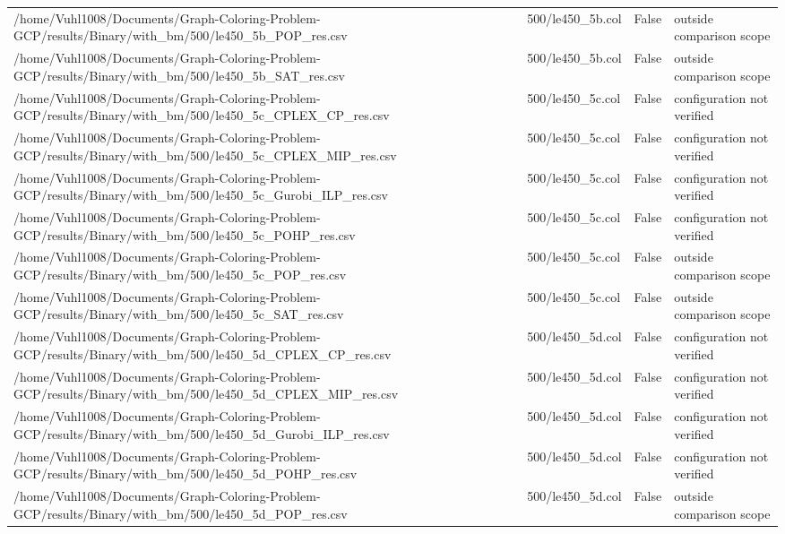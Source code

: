 \begin{table}[htbp]
\begin{tabular}{llll}
/home/Vuhl1008/Documents/Graph-Coloring-Problem-GCP/results/Binary/with\_bm/500/le450\_5b\_POP\_res.csv & 500/le450\_5b.col & False & outside comparison scope \\
/home/Vuhl1008/Documents/Graph-Coloring-Problem-GCP/results/Binary/with\_bm/500/le450\_5b\_SAT\_res.csv & 500/le450\_5b.col & False & outside comparison scope \\
/home/Vuhl1008/Documents/Graph-Coloring-Problem-GCP/results/Binary/with\_bm/500/le450\_5c\_CPLEX\_CP\_res.csv & 500/le450\_5c.col & False & configuration not verified \\
/home/Vuhl1008/Documents/Graph-Coloring-Problem-GCP/results/Binary/with\_bm/500/le450\_5c\_CPLEX\_MIP\_res.csv & 500/le450\_5c.col & False & configuration not verified \\
/home/Vuhl1008/Documents/Graph-Coloring-Problem-GCP/results/Binary/with\_bm/500/le450\_5c\_Gurobi\_ILP\_res.csv & 500/le450\_5c.col & False & configuration not verified \\
/home/Vuhl1008/Documents/Graph-Coloring-Problem-GCP/results/Binary/with\_bm/500/le450\_5c\_POHP\_res.csv & 500/le450\_5c.col & False & configuration not verified \\
/home/Vuhl1008/Documents/Graph-Coloring-Problem-GCP/results/Binary/with\_bm/500/le450\_5c\_POP\_res.csv & 500/le450\_5c.col & False & outside comparison scope \\
/home/Vuhl1008/Documents/Graph-Coloring-Problem-GCP/results/Binary/with\_bm/500/le450\_5c\_SAT\_res.csv & 500/le450\_5c.col & False & outside comparison scope \\
/home/Vuhl1008/Documents/Graph-Coloring-Problem-GCP/results/Binary/with\_bm/500/le450\_5d\_CPLEX\_CP\_res.csv & 500/le450\_5d.col & False & configuration not verified \\
/home/Vuhl1008/Documents/Graph-Coloring-Problem-GCP/results/Binary/with\_bm/500/le450\_5d\_CPLEX\_MIP\_res.csv & 500/le450\_5d.col & False & configuration not verified \\
/home/Vuhl1008/Documents/Graph-Coloring-Problem-GCP/results/Binary/with\_bm/500/le450\_5d\_Gurobi\_ILP\_res.csv & 500/le450\_5d.col & False & configuration not verified \\
/home/Vuhl1008/Documents/Graph-Coloring-Problem-GCP/results/Binary/with\_bm/500/le450\_5d\_POHP\_res.csv & 500/le450\_5d.col & False & configuration not verified \\
/home/Vuhl1008/Documents/Graph-Coloring-Problem-GCP/results/Binary/with\_bm/500/le450\_5d\_POP\_res.csv & 500/le450\_5d.col & False & outside comparison scope \\

\end{tabular}
\end{table}
